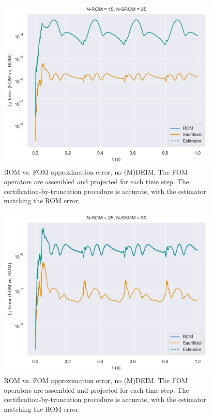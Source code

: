\documentclass[../../thesis.tex]{subfiles}
\begin{document}
\clearpage
\begin{figure}[h]
    \includegraphics[width =\columnwidth]{research_project/piston/figures/nonlinear_displacement/truncation_error/no_deim/error_estimation_rom_15_srom_25_0.png}
    \caption{ROM vs. FOM approximation error, no (M)DEIM.
    The FOM operators are assembled and projected for each time step.
    The certification-by-truncation procedure is accurate, with the estimator matching the ROM error.}
    \label{fig:nlinear_disp_no_deim_errors_above_threshold}
\end{figure}

\begin{figure}[h]
    \includegraphics[width =\columnwidth]{research_project/piston/figures/nonlinear_displacement/truncation_error/no_deim/error_estimation_rom_25_srom_30_0.png}
    \caption{ROM vs. FOM approximation error, no (M)DEIM.
    The FOM operators are assembled and projected for each time step.
    The certification-by-truncation procedure is accurate, with the estimator matching the ROM error.}
    \label{fig:nlinear_disp_no_deim_errors_below_threshold}
\end{figure}
\end{document}
